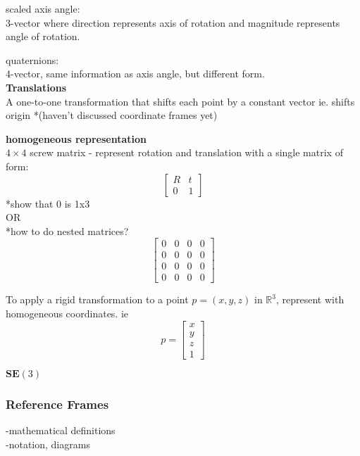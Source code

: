 		scaled axis angle:\\
		3-vector where direction represents axis of rotation and magnitude represents angle of rotation.		
		
		quaternions:\\
		4-vector, same information as axis angle, but different form.\\
		
		\textbf{Translations}\\
		A one-to-one transformation that shifts each point by a constant vector ie. shifts origin *(haven't discussed coordinate frames yet) 

		\textbf{homogeneous representation}\\
		$4\times4$ screw matrix - represent rotation and translation with a single matrix of form:\\
		\begin{equation}
				\begin{bmatrix}
				  R		&	t \\
				  0		& 	1 
				\end{bmatrix}
		\end{equation}
		*show that 0 is 1x3\\
		OR\\
		*how to do nested matrices?
		\begin{equation}
		\begin{bmatrix}
		  0		&	0 	& 	0 	& 	0\\
		  0		& 	0  	& 	0 	& 	0\\
		  0		& 	0  	& 	0 	& 	0\\
		  0		& 	0 	& 	0 	& 	0
		\end{bmatrix}
		\end{equation}
		
		To apply a rigid transformation to a point $p = (x,y,z) $ in $\mathbb{R}^3$, represent with homogeneous coordinates. ie
		\begin{equation}
		p = 
		\begin{bmatrix}
				  x	\\
				  y	\\
				  z	\\
				  1	
		\end{bmatrix}
		\end{equation}
	
		\textbf{ $\textbf{SE}(3)$}\\
		
		
	\subsubsection{Reference Frames}
		-mathematical definitions\\
		-notation, diagrams
